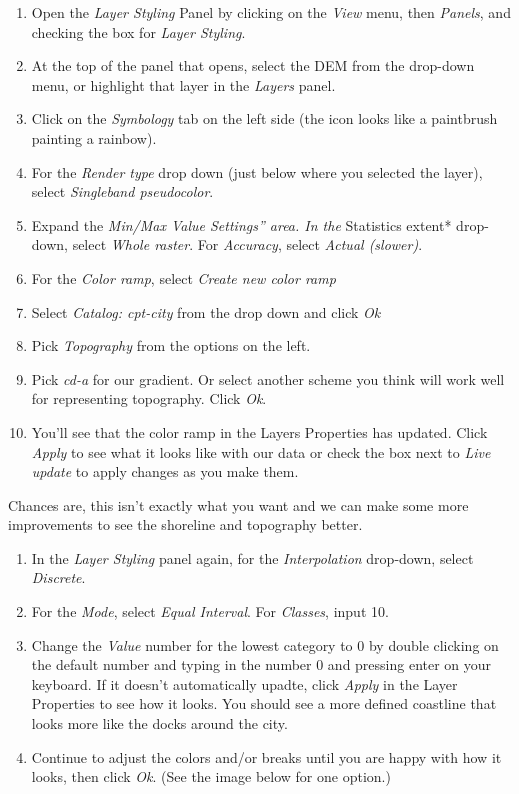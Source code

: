 \documentclass[
]{article}
\providecommand{\tightlist}{%
  \setlength{\itemsep}{0pt}\setlength{\parskip}{0pt}}
\begin{document}
\begin{enumerate}
\def\labelenumi{\arabic{enumi}.}
\tightlist
\item
  Open the \emph{Layer Styling} Panel by clicking on the \emph{View} menu, then \emph{Panels}, and checking the box for \emph{Layer Styling}.
\item
  At the top of the panel that opens, select the DEM from the drop-down menu, or highlight that layer in the \emph{Layers} panel.
\item
  Click on the \emph{Symbology} tab on the left side (the icon looks like a paintbrush painting a rainbow).
\item
  For the \emph{Render type} drop down (just below where you selected the layer), select \emph{Singleband pseudocolor}.
\item
  Expand the \emph{Min/Max Value Settings'' area. In the }Statistics extent* drop-down, select \emph{Whole raster}. For \emph{Accuracy}, select \emph{Actual (slower)}.
\item
  For the \emph{Color ramp}, select \emph{Create new color ramp}
\item
  Select \emph{Catalog: cpt-city} from the drop down and click \emph{Ok}
\item
  Pick \emph{Topography} from the options on the left.
\item
  Pick \emph{cd-a} for our gradient. Or select another scheme you think will work well for representing topography. Click \emph{Ok}.
\item
  You'll see that the color ramp in the Layers Properties has updated. Click \emph{Apply} to see what it looks like with our data or check the box next to \emph{Live update} to apply changes as you make them.
\end{enumerate}

Chances are, this isn't exactly what you want and we can make some more improvements to see the shoreline and topography better.

\begin{enumerate}
\def\labelenumi{\arabic{enumi}.}
\tightlist
\item
  In the \emph{Layer Styling} panel again, for the \emph{Interpolation} drop-down, select \emph{Discrete}.
\item
  For the \emph{Mode}, select \emph{Equal Interval}. For \emph{Classes}, input 10.
\item
  Change the \emph{Value} number for the lowest category to 0 by double clicking on the default number and typing in the number 0 and pressing enter on your keyboard. If it doesn't automatically upadte, click \emph{Apply} in the Layer Properties to see how it looks. You should see a more defined coastline that looks more like the docks around the city.
\item
  Continue to adjust the colors and/or breaks until you are happy with how it looks, then click \emph{Ok}. (See the image below for one option.)
\end{enumerate}
\end{document}
